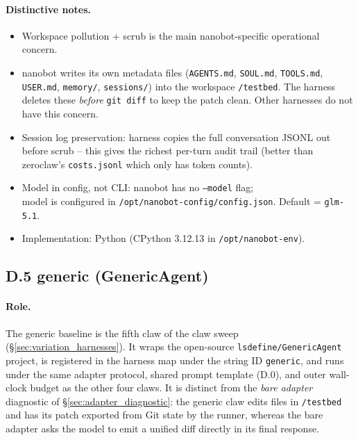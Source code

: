 \paragraph{Distinctive notes.}
\begin{itemize}
  \item Workspace pollution + scrub is the main nanobot-specific operational concern.
  \item nanobot writes its own metadata files (\texttt{AGENTS.md}, \texttt{SOUL.md}, \texttt{TOOLS.md}, \texttt{USER.md}, \texttt{memory/}, \texttt{sessions/}) into the workspace \texttt{/testbed}. The harness deletes these \emph{before} \texttt{git diff} to keep the patch clean. Other harnesses do not have this concern.
  \item Session log preservation: harness copies the full conversation JSONL out before scrub -- this gives the richest per-turn audit trail (better than zeroclaw's \texttt{costs.jsonl} which only has token counts).
  \item Model in config, not CLI: nanobot has no \texttt{--model} flag;\\model is configured in \texttt{/opt/nanobot-config/config.json}. Default = \texttt{glm-5.1}.
  \item Implementation: Python (CPython 3.12.13 in \texttt{/opt/nanobot-env}).
\end{itemize}

\subsection*{D.5 generic (GenericAgent)}

\paragraph{Role.}
The generic baseline is the fifth claw of the claw sweep
(\S\ref{sec:variation_harnesses}). It wraps the open-source
\texttt{lsdefine/GenericAgent} project, is registered in the harness map under
the string ID \texttt{generic}, and runs under the same adapter protocol,
shared prompt template (D.0), and outer wall-clock budget as the other four
claws. It is distinct from the \emph{bare adapter} diagnostic of
\S\ref{sec:adapter_diagnostic}: the generic claw edits files in
\texttt{/testbed} and has its patch exported from Git state by the runner,
whereas the bare adapter asks the model to emit a unified diff directly in its
final response.

